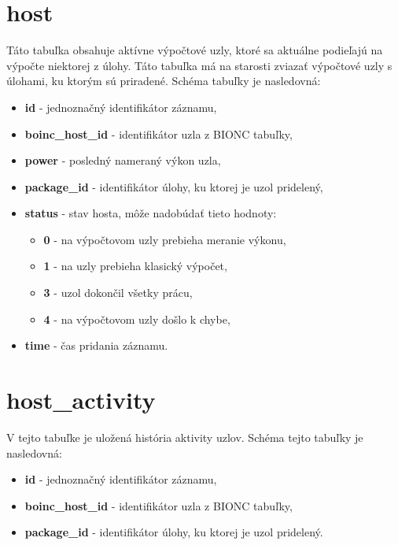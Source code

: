 \documentclass[zadani,slovak]{fitthesis}
\begin{document}
\section{host} \label{fcHost}
Táto tabuľka obsahuje aktívne výpočtové uzly, ktoré sa aktuálne podieľajú na výpočte niektorej z úlohy. Táto tabuľka má na starosti zviazať výpočtové uzly s úlohami, ku ktorým sú priradené. Schéma tabuľky je nasledovná:
\begin{itemize}
    \item \textbf{id} - jednoznačný identifikátor záznamu,
    \item \textbf{boinc\_host\_id} - identifikátor uzla z BIONC tabuľky,
    \item \textbf{power} - posledný nameraný výkon uzla,
    \item \textbf{package\_id} - identifikátor úlohy, ku ktorej je uzol pridelený,
    \item \textbf{status} - stav hosta, môže nadobúdať tieto hodnoty:
      \begin{itemize}
        \item \textbf{0} - na výpočtovom uzly prebieha meranie výkonu,
        \item \textbf{1} - na uzly prebieha klasický výpočet,
        \item \textbf{3} - uzol dokončil všetky prácu,
        \item \textbf{4} - na výpočtovom uzly došlo k chybe,
      \end{itemize}
    \item \textbf{time} - čas pridania záznamu.
\end{itemize}


\section{host\_activity}
V tejto tabuľke je uložená história aktivity uzlov. Schéma tejto tabuľky je nasledovná:
\begin{itemize}
    \item \textbf{id} - jednoznačný identifikátor záznamu,
    \item \textbf{boinc\_host\_id} - identifikátor uzla z BIONC tabuľky,
    \item \textbf{package\_id} - identifikátor úlohy, ku ktorej je uzol pridelený.
\end{itemize}
\end{document}

